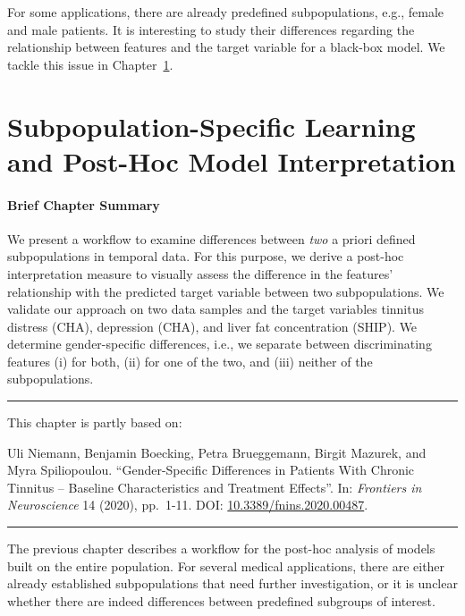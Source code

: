 \documentclass[
  oneside]{book}
\newenvironment{infobox}[1]
  {
  \begin{chapter-summary}
  }
  {
  \end{chapter-summary}
  }
\newenvironment{lit}
  {
  \vspace{8pt}
  \hrule
  \vspace{8pt}
  }
  {
  \vspace{8pt}
  \hrule
  \vspace{8pt}
  }
\begin{document}
For some applications, there are already predefined subpopulations, e.g., female and male patients.
It is interesting to study their differences regarding the relationship between features and the target variable for a black-box model.
We tackle this issue in Chapter~\ref{gender}.

\hypertarget{gender}{%
\chapter{Subpopulation-Specific Learning and Post-Hoc Model Interpretation}\label{gender}}

\begin{infobox}{tasks.pdf}

\hypertarget{brief-chapter-summary-6}{%
\subsubsection*{Brief Chapter Summary}\label{brief-chapter-summary-6}}

We present a workflow to examine differences between \emph{two} a priori defined subpopulations in temporal data.
For this purpose, we derive a post-hoc interpretation measure to visually assess the difference in the features' relationship with the predicted target variable between two subpopulations.
We validate our approach on two data samples and the target variables tinnitus distress (CHA), depression (CHA), and liver fat concentration (SHIP).
We determine gender-specific differences, i.e., we separate between discriminating features (i) for both, (ii) for one of the two, and (iii) neither of the subpopulations.

\end{infobox}

\begin{lit}

This chapter is partly based on:

Uli Niemann, Benjamin Boecking, Petra Brueggemann, Birgit Mazurek, and Myra Spiliopoulou. ``Gender-Specific Differences in Patients With Chronic Tinnitus -- Baseline Characteristics and Treatment Effects''. In: \emph{Frontiers in Neuroscience} 14 (2020), pp.~1-11. DOI: \href{https://doi.org/10.3389\%2Ffnins.2020.00487}{10.3389/fnins.2020.00487}.

\end{lit}

The previous chapter describes a workflow for the post-hoc analysis of models built on the entire population.
For several medical applications, there are either already established subpopulations that need further investigation, or it is unclear whether there are indeed differences between predefined subgroups of interest.
\end{document}
